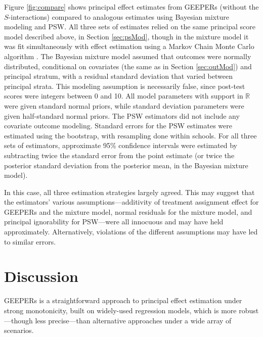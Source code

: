 \documentclass{statsoc} %
\begin{document}
Figure \ref{fig:compare} shows principal effect estimates from GEEPERs (without the $S$-interactions) compared to analogous estimates using Bayesian mixture modeling and PSW.
All three sets of estimates relied on the same principal score model described above, in Section \ref{sec:psMod}, though in the mixture model it was fit simultaneously with effect estimation using a Markov Chain Monte Carlo algorithm \citep{rstan}.
The Bayesian mixture model assumed that outcomes were normally distributed, conditional on covariates (the same as in Section \ref{sec:outMod}) and principal stratum, with a residual standard deviation that varied between principal strata. This modeling assumption is necessarily false, since post-test scores were integers between 0 and 10. All model parameters with support in $\mathbb{R}$ were given standard normal priors, while standard deviation parameters were given half-standard normal priors.
The PSW estimators did not include any covariate outcome modeling. Standard errors for the PSW estimates were estimated using the bootstrap, with resampling done within schools.
For all three sets of estimators, approximate 95\% confidence intervals were estimated by subtracting twice the standard error from the point estimate (or twice the posterior standard deviation from the posterior mean, in the Bayesian mixture model).

In this case, all three estimation strategies largely agreed. This may suggest that the estimators' various assumptions---additivity of treatment assignment effect for GEEPERs and the mixture model, normal residuals for the mixture model, and principal ignorability for PSW---were all innocuous and may have held approximately. Alternatively, violations of the different assumptions may have led to similar errors.


\section{Discussion}\label{sec:discussion}
GEEPERs is a straightforward approach to principal effect estimation under strong monotonicity, built on widely-used regression models, which is more robust---though less precise---than alternative approaches under a wide array of scenarios.
\end{document}
